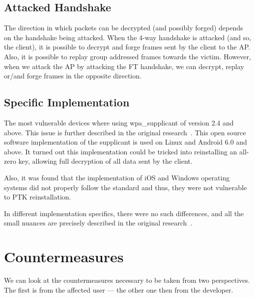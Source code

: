 \subsection{Attacked Handshake}

The direction in which packets can be decrypted (and possibly forged) depends on the handshake being attacked. When the 4-way handshake is attacked (and so, the client), it is possible to decrypt and forge frames sent by the client to the AP. Also, it is possible to replay group addressed frames towards the victim. However, when we attack the AP by attacking the FT handshake, we can decrypt, replay or/and forge frames in the opposite direction.~\cite{VA_ccs2017}

\subsection{Specific Implementation}

The most vulnerable devices where using wpa\_supplicant of version 2.4 and above. This issue is further described in the original research~\cite{VA_ccs2017}. This open source software implementation of the supplicant is used on Linux and Android 6.0 and above. It turned out this implementation could be tricked into reinstalling an all-zero key, allowing full decryption of all data sent by the client.

Also, it was found that the implementation of iOS and Windows operating systems did not properly follow the standard and thus, they were not vulnerable to PTK reinstallation.

In different implementation specifics, there were no such differences, and all the small nuances are precisely described in the original research~\cite{VA_ccs2017, VA_ccs2018}.

\section{Countermeasures}
\label{sec:countermeasures}
We can look at the countermeasures necessary to be taken from two perspectives. The first is from the affected user --- the other one then from the developer. 

